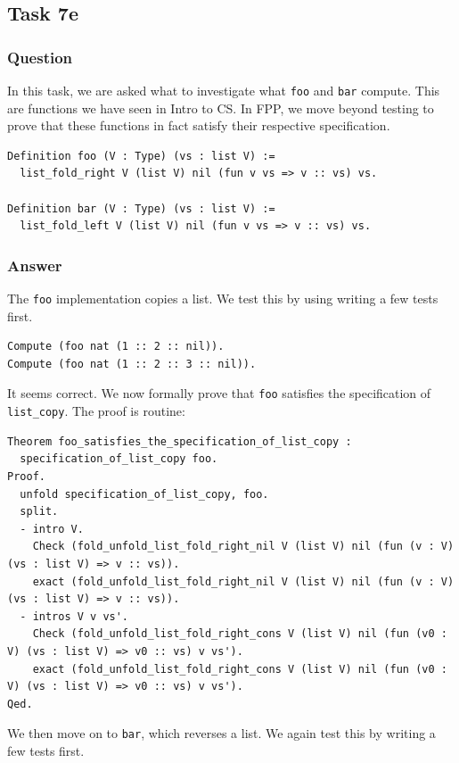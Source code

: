 \documentclass{article}
\begin{document}
\subsection{Task 7e}

\subsubsection{Question}
In this task, we are asked what to investigate what \texttt{foo} and \texttt{bar} compute. This are functions we have seen in Intro to CS. In FPP, we move beyond testing to prove that these functions in fact satisfy their respective specification.

\begin{lstlisting}
Definition foo (V : Type) (vs : list V) :=
  list_fold_right V (list V) nil (fun v vs => v :: vs) vs.
        
Definition bar (V : Type) (vs : list V) :=
  list_fold_left V (list V) nil (fun v vs => v :: vs) vs.  
\end{lstlisting}

\subsubsection{Answer}
The \texttt{foo} implementation copies a list. We test this by using writing a few tests first.

\begin{lstlisting}
Compute (foo nat (1 :: 2 :: nil)).
Compute (foo nat (1 :: 2 :: 3 :: nil)).
\end{lstlisting}

It seems correct. We now formally prove that \texttt{foo} satisfies the specification of \texttt{list\_copy}. The proof is routine:

\begin{lstlisting}
Theorem foo_satisfies_the_specification_of_list_copy :
  specification_of_list_copy foo.
Proof.
  unfold specification_of_list_copy, foo.
  split.
  - intro V.
    Check (fold_unfold_list_fold_right_nil V (list V) nil (fun (v : V) (vs : list V) => v :: vs)).
    exact (fold_unfold_list_fold_right_nil V (list V) nil (fun (v : V) (vs : list V) => v :: vs)).
  - intros V v vs'.
    Check (fold_unfold_list_fold_right_cons V (list V) nil (fun (v0 : V) (vs : list V) => v0 :: vs) v vs').
    exact (fold_unfold_list_fold_right_cons V (list V) nil (fun (v0 : V) (vs : list V) => v0 :: vs) v vs').
Qed.
\end{lstlisting}

We then move on to \texttt{bar}, which reverses a list. We again test this by writing a few tests first.
\end{document}
